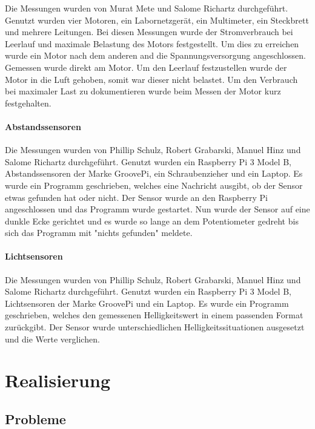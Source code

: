 \documentclass[notitlepage]{report}
\begin{document}
Die Messungen wurden von Murat Mete und Salome Richartz durchgef\"{u}hrt. Genutzt wurden vier Motoren, ein Labornetzger\"{a}t, ein Multimeter, ein Steckbrett und mehrere Leitungen. Bei diesen Messungen wurde der Stromverbrauch bei Leerlauf und maximale Belastung des Motors festgestellt. Um dies zu erreichen wurde ein Motor nach dem anderen and die Spannungsversorgung angeschlossen. Gemessen wurde direkt am Motor. Um den Leerlauf festzustellen wurde der Motor in die Luft gehoben, somit war dieser nicht belastet. Um den Verbrauch bei maximaler Last zu dokumentieren wurde beim Messen der Motor kurz festgehalten.

\subsubsection{Abstandssensoren}

Die Messungen wurden von Phillip Schulz, Robert Grabarski, Manuel Hinz und Salome Richartz durchgef\"{u}hrt. Genutzt wurden ein Raspberry Pi 3 Model B, Abstandssensoren der Marke GroovePi, ein Schraubenzieher und ein Laptop. Es wurde ein Programm geschrieben, welches eine Nachricht ausgibt, ob der Sensor etwas gefunden hat oder nicht. Der Sensor wurde an den Raspberry Pi angeschlossen und das Programm wurde gestartet. Nun wurde der Sensor auf eine dunkle Ecke gerichtet und es wurde so lange an dem Potentiometer gedreht bis sich das Programm mit "nichts gefunden" meldete.

\subsubsection{Lichtsensoren}

Die Messungen wurden von Phillip Schulz, Robert Grabarski, Manuel Hinz und Salome Richartz durchgef\"{u}hrt. Genutzt wurden ein Raspberry Pi 3 Model B, Lichtsensoren der Marke GroovePi und ein Laptop. Es wurde ein Programm geschrieben, welches den gemessenen Helligkeitswert in einem passenden Format zur\"{u}ckgibt. Der Sensor wurde unterschiedlichen Helligkeitssituationen ausgesetzt und die Werte verglichen.


\chapter{Realisierung}

\section{Probleme}
\end{document}
